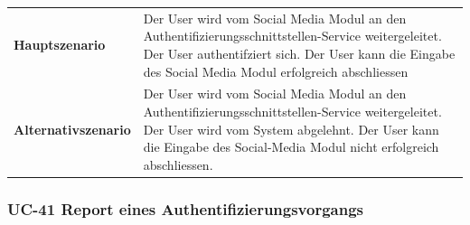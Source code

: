 \begin{longtable}[c]{@{}ll@{}}
\begin{minipage}[t]{0.34\columnwidth}
\textbf{Hauptszenario}
\strut\end{minipage} &
\begin{minipage}[t]{0.60\columnwidth}\raggedright\strut
Der User wird vom Social Media Modul an den
Authentifizierungsschnittstellen-Service weitergeleitet. Der User
authentifziert sich. Der User kann die Eingabe des Social Media Modul
erfolgreich abschliessen
\strut\end{minipage}\tabularnewline
\begin{minipage}[t]{0.34\columnwidth}\raggedright\strut
\textbf{Alternativszenario}
\strut\end{minipage} &
\begin{minipage}[t]{0.60\columnwidth}\raggedright\strut
Der User wird vom Social Media Modul an den
Authentifizierungsschnittstellen-Service weitergeleitet. Der User wird
vom System abgelehnt. Der User kann die Eingabe des Social-Media Modul
nicht erfolgreich abschliessen.
\strut\end{minipage}\tabularnewline
\bottomrule
\end{longtable}

\subsubsection{UC-41 Report eines
Authentifizierungsvorgangs}\label{uc-41-report-eines-authentifizierungsvorgangs}


